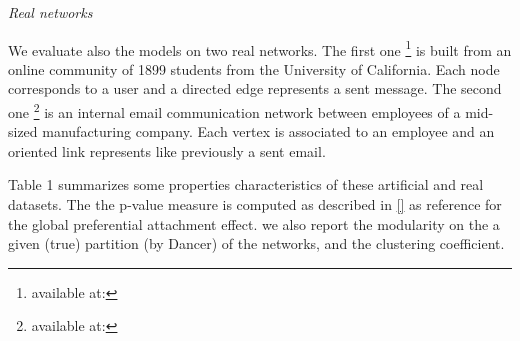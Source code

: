 \textit{Real networks}

We evaluate also the models on two  real networks.
The first one \footnote{available at:} is built from an online community of 1899 students from the University of California. Each node corresponds to a user and a    directed edge represents a sent message.
The second one \footnote{available at:} is an internal email communication network between employees of a mid-sized manufacturing company. Each vertex is associated  to an employee and an oriented link represents like previously a sent email.

Table 1 summarizes some properties characteristics of these artificial and real datasets. The  the p-value measure is computed as described in \ref{} as reference for the global preferential attachment effect. we also report the modularity on the a given (true) partition (by Dancer) of the networks, and the clustering coefficient.

